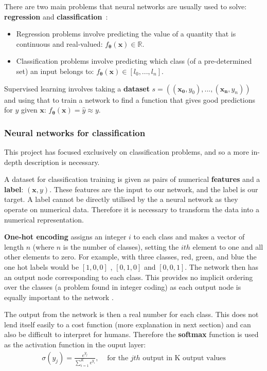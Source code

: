 \documentclass[12pt,a4paper,twoside,openright]{report}
\renewcommand{\vec}[1]{\bm{#1}}
\begin{document}
There are two main problems that neural networks are usually used to solve: \textbf{regression} and \textbf{classification}~\cite{ML_Bayes}:
\begin{itemize}
  \item Regression problems involve predicting the value of a quantity that is continuous and real-valued: $f_{\vec{\theta}}(\vec{x}) \in \mathbb{R}$. 
  \item Classification problems involve predicting which class (of a pre-determined set) an input belongs to: $f_{\vec{\theta}}(\vec{x}) \in [l_0,...,l_n]$.
\end{itemize}

Supervised learning involves taking a \textbf{dataset} $s=((\vec{x_0}, y_0),...,(\vec{x_n}, y_n))$ and using that to train a network to find a function 
that gives good predictions for $y$ given $\vec{x}$: $f_{\vec{\theta}}(\vec{x}) = \hat{y} \approx y$.

\subsubsection{Neural networks for classification}
This project has focused exclusively on classification problems, and so a more in-depth description is necessary.

A dataset for classification training is given as pairs of numerical \textbf{features} and a \textbf{label}: $(\vec{x}, y)$. These features are the input to our network,
and the label is our target. A label cannot be directly utilised by the a neural network as they operate on numerical data. Therefore it is 
necessary to transform the data into a numerical representation.

\textbf{One-hot encoding} assigns an integer $i$ to each class and makes a vector of length $n$ (where $n$ is the 
number of classes), setting the $ith$ element to one and all other elements to zero. For example, with three classes, red, green, and blue
the one hot labels would be $[1, 0, 0]$ , $[0, 1, 0]$ and $[0, 0, 1]$. The network then has an output node corresponding to each class.
This provides no implicit ordering over the classes (a problem found in integer coding) as each output node is equally important to the 
network \cite{WhyOneHo55:online}.

The output from the network is then a real number for each class. This does not lend itself easily to a cost function (more explanation
in next section) and can also be difficult to interpret for humans. Therefore the \textbf{softmax} function is used as the activation function
in the ouput layer:
\begin{align} \label{softmax}
  \sigma(y_j) = \frac{e^{y_j}}{\sum_{i=1}^{K} e^{y_i}},  &\text{ for the $jth$ output in K output values}
\end{align}
\end{document}
